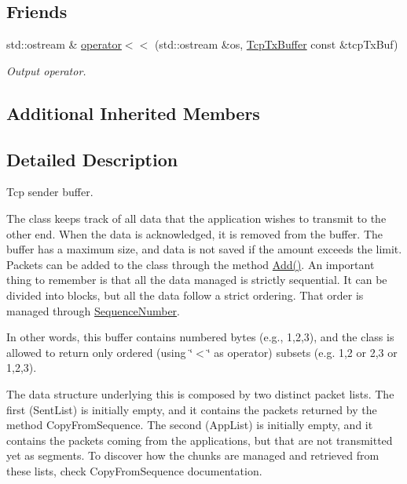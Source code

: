 \subsection*{Friends}
\begin{DoxyCompactItemize}
\item 
std\+::ostream \& \hyperlink{classns3_1_1TcpTxBuffer_ac79ac25be6b4aef60bb3fdb7b6c64528}{operator$<$$<$} (std\+::ostream \&os, \hyperlink{classns3_1_1TcpTxBuffer}{Tcp\+Tx\+Buffer} const \&tcp\+Tx\+Buf)
\begin{DoxyCompactList}\small\item\em Output operator. \end{DoxyCompactList}\end{DoxyCompactItemize}
\subsection*{Additional Inherited Members}


\subsection{Detailed Description}
Tcp sender buffer. 

The class keeps track of all data that the application wishes to transmit to the other end. When the data is acknowledged, it is removed from the buffer. The buffer has a maximum size, and data is not saved if the amount exceeds the limit. Packets can be added to the class through the method \hyperlink{classns3_1_1TcpTxBuffer_a275d96f2c58333c9e7c5fe0f1fa152e1}{Add()}. An important thing to remember is that all the data managed is strictly sequential. It can be divided into blocks, but all the data follow a strict ordering. That order is managed through \hyperlink{classns3_1_1SequenceNumber}{Sequence\+Number}.

In other words, this buffer contains numbered bytes (e.\+g., 1,2,3), and the class is allowed to return only ordered (using \char`\"{}$<$\char`\"{} as operator) subsets (e.\+g. 1,2 or 2,3 or 1,2,3).

The data structure underlying this is composed by two distinct packet lists. The first (Sent\+List) is initially empty, and it contains the packets returned by the method Copy\+From\+Sequence. The second (App\+List) is initially empty, and it contains the packets coming from the applications, but that are not transmitted yet as segments. To discover how the chunks are managed and retrieved from these lists, check Copy\+From\+Sequence documentation.

